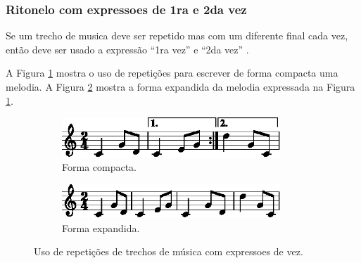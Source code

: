 \subsubsection{Ritonelo com expressoes de 1ra e 2da vez}
Se um trecho de musica deve ser repetido mas com um diferente final cada vez,
então deve ser usado a expressão ``1ra vez'' e ``2da vez''
\cite[pp. 239]{medteoria} \cite[pp. 169]{cardoso1973curso}.

A Figura \ref{fig:ritonelo-times1-1} mostra o uso de repetições para escrever de forma compacta uma melodia.
A Figura \ref{fig:ritonelo-times2-1} mostra a forma expandida da melodia expressada na Figura \ref{fig:ritonelo-times1-1}.
\begin{figure}[!h]
\centering
    \begin{subfigure}[b]{0.75\textwidth}
        \includegraphics[width=0.9\textwidth]{chapters/cap-musica-basica/ritonelo-times1-1.eps}
        \caption{Forma compacta.}
        \label{fig:ritonelo-times1-1}
    \end{subfigure}
    \begin{subfigure}[b]{0.75\textwidth}
        \includegraphics[width=0.9\textwidth]{chapters/cap-musica-basica/ritonelo-times2-1.eps}
        \caption{Forma expandida.}
        \label{fig:ritonelo-times2-1}
    \end{subfigure}
\caption{Uso de repetições de trechos de música com expressoes de vez.}
\label{fig:ritonelo-times1}
\end{figure}

